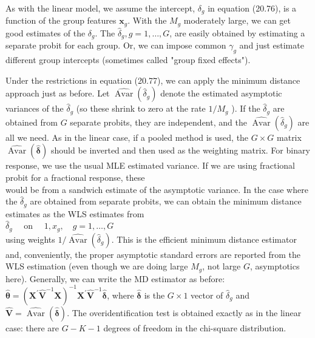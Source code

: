 \documentclass[10pt]{article}
\begin{document}
As with the linear model, we assume the intercept, $\delta_{g}$ in equation (20.76), is a function of the group features $\mathbf{x}_{g}$. With the $M_{g}$ moderately large, we can get good estimates of the $\delta_{g}$. The $\hat{\delta}_{g}, g=1, \ldots, G$, are easily obtained by estimating a separate probit for each group. Or, we can impose common $\gamma_{g}$ and just estimate different group intercepts (sometimes called "group fixed effects").

Under the restrictions in equation (20.77), we can apply the minimum distance approach just as before. Let $\widehat{\operatorname{Avar}}\left(\hat{\delta}_{g}\right)$ denote the estimated asymptotic variances of the $\hat{\delta}_{g}$ (so these shrink to zero at the rate $1 / M_{g}$ ). If the $\hat{\delta}_{g}$ are obtained from $G$ separate probits, they are independent, and the $\widehat{\operatorname{Avar}}\left(\hat{\delta}_{g}\right)$ are all we need. As in the linear case, if a pooled method is used, the $G \times G$ matrix $\widehat{\operatorname{Avar}}(\hat{\boldsymbol{\delta}})$ should be inverted and then used as the weighting matrix. For binary response, we use the usual MLE estimated variance. If we are using fractional probit for a fractional response, these\\
would be from a sandwich estimate of the asymptotic variance. In the case where the $\hat{\delta}_{g}$ are obtained from separate probits, we can obtain the minimum distance estimates as the WLS estimates from\\
$\hat{\delta}_{g} \quad$ on $\quad 1, x_{g}, \quad g=1, \ldots, G$\\
using weights $1 / \widehat{\operatorname{Avar}}\left(\hat{\delta}_{g}\right)$. This is the efficient minimum distance estimator and, conveniently, the proper asymptotic standard errors are reported from the WLS estimation (even though we are doing large $M_{g}$, not large $G$, asymptotics here). Generally, we can write the MD estimator as before: $\hat{\boldsymbol{\theta}}=\left(\mathbf{X}^{\prime} \hat{\mathbf{V}}^{-1} \mathbf{X}\right)^{-1} \mathbf{X}^{\prime} \hat{\mathbf{V}}^{-1} \hat{\boldsymbol{\delta}}$, where $\hat{\boldsymbol{\delta}}$ is the $G \times 1$ vector of $\hat{\delta}_{g}$ and $\hat{\mathbf{V}}=\widehat{\operatorname{Avar}}(\hat{\boldsymbol{\delta}})$. The overidentification test is obtained exactly as in the linear case: there are $G-K-1$ degrees of freedom in the chi-square distribution.
\end{document}
